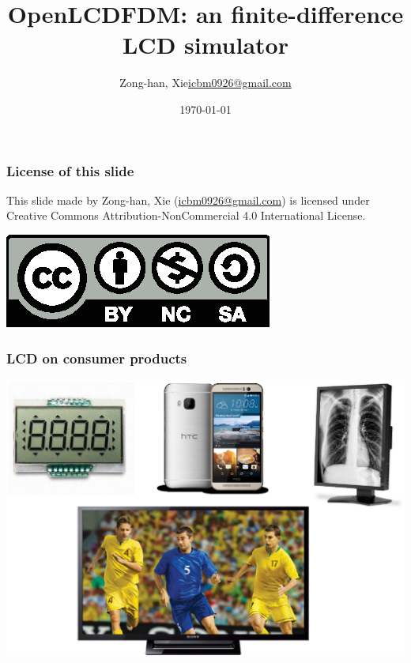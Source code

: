 \documentclass{beamer}
\title{OpenLCDFDM: an finite-difference LCD simulator}
\author{\texorpdfstring{Zong-han, Xie\newline\url{icbm0926@gmail.com}}{Zong-han, Xie}}
\date{\today}
\begin{document}
\begin{frame}
\titlepage
\end{frame}
\begin{frame}[label=licensepage]
\frametitle{License of this slide}
This slide made by Zong-han, Xie (\href{icbm0926@gmail.com}{icbm0926@gmail.com}) is licensed under Creative Commons Attribution-NonCommercial 4.0 International License. \newline
\begin{center}
\includegraphics[scale=2]{by-nc-sa.eps}
\end{center}
\end{frame}
\begin{frame}
\frametitle{LCD on consumer products}
\begin{center}
\includegraphics[scale=0.4]{LCD_Consumers.eps}
\end{center}
\end{frame}
\end{document}
